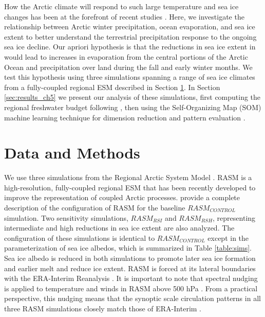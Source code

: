 How the Arctic climate will respond to such large temperature and sea ice changes has been at the forefront of recent studies \citep[e.g. ][]{Kazutoshi_2014,Simmonds_2014,Wegmann_2015,Vihma_2014}.
Here, we investigate the relationship between Arctic winter precipitation, ocean evaporation, and sea ice extent to better understand the terrestrial precipitation response to the ongoing sea ice decline.
Our apriori hypothesis is that the reductions in sea ice extent in would lead to increases in evaporation from the central portions of the Arctic Ocean and precipitation over land during the fall and early winter months. %
We test this hypothesis using three simulations spanning a range of sea ice climates from a fully-coupled regional  ESM described in Section \ref{sec:data_models_ch5}.
In Section \ref{sec:results_ch5} we present our analysis of these simulations, first computing the regional freshwater budget following \citet{Serreze_2006a}, then using the Self-Organizing Map (SOM) machine learning technique for dimension reduction and pattern evaluation \citep{Kohonen_1998,Hewitson_2002}.

\section{Data and Methods}
\label{sec:data_models_ch5}

We use three simulations from the Regional Arctic System Model \citep[RASM; ][]{Hamman_2016a,Roberts_2015a}.
RASM is a high-resolution, fully-coupled regional ESM that has been recently developed to improve the representation of coupled Arctic processes.
\citet{Hamman_2016b} provide a complete description of the configuration of RASM for the baseline $RASM_{CONTROL}$ simulation.
Two sensitivity simulations, $RASM_{RSI}$ and $RASM_{RSH}$, representing intermediate and high reductions in sea ice extent are also analyzed.
The configuration of these simulations is identical to $RASM_{CONTROL}$ except in the parameterization of sea ice albedos, which is summarized in Table \ref{table:sims}.
Sea ice albedo is reduced in both simulations to promote later sea ice formation and earlier melt and reduce ice extent. %
RASM is forced at its lateral boundaries with the ERA-Interim Reanalysis \citep{Dee_2011}.
It is important to note that spectral nudging is applied to temperature and winds in RASM above 500 hPa \citep{Cassano_2016}.
From a practical perspective, this nudging means that the synoptic scale circulation patterns in all three RASM simulations closely match those of ERA-Interim \citep{Glisan_2013}.

